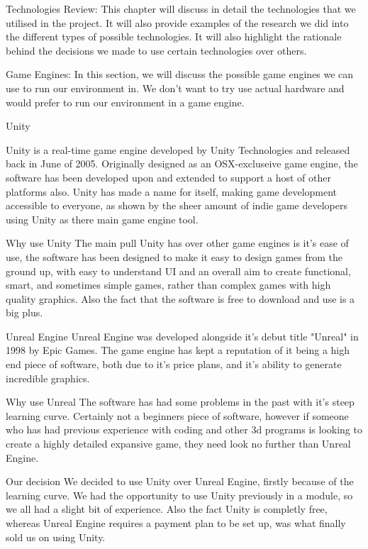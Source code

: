 
Technologies Review:
This chapter will discuss in detail the technologies that we utilised in the project. It will also provide examples of the research we did into the different types of possible technologies. It will also highlight the rationale behind the decisions we made to use certain technologies over others.

Game Engines:
In this section, we will discuss the possible game engines we can use to run our environment in. We don't want to try use actual hardware and would prefer to run our environment in a game engine.

Unity

Unity is a real-time game engine developed by Unity Technologies and released back in June of 2005. Originally designed as an OSX-excluseive game engine, the software has been developed upon and extended to support a host of other platforms also. Unity has made a name for itself, making game development accessible to everyone, as shown by the sheer amount of indie game developers using Unity as there main game engine tool.

Why use Unity
The main pull Unity has over other game engines is it's ease of use, the software has been designed to make it easy to design games from the ground up, with easy to understand UI and an overall aim to create functional, smart, and sometimes simple games, rather than complex games with high quality graphics. Also the fact that the software is free to download and use is a big plus.

Unreal Engine
Unreal Engine was developed alongside it's debut title "Unreal" in 1998 by Epic Games. The game engine has kept a reputation of it being a high end piece of software, both due to it's price plans, and it's ability to generate incredible graphics.

Why use Unreal
The software has had some problems in the past with it's steep learning curve. Certainly not a beginners piece of software, however if someone who has had previous experience with coding and other 3d programs is looking to create a highly detailed expansive game, they need look no further than Unreal Engine.

Our decision
We decided to use Unity over Unreal Engine, firstly because of the learning curve. We had the opportunity to use Unity previously in a module, so we all had a slight bit of experience. Also the fact Unity is completly free, whereas Unreal Engine requires a payment plan to be set up, was what finally sold us on using Unity.


